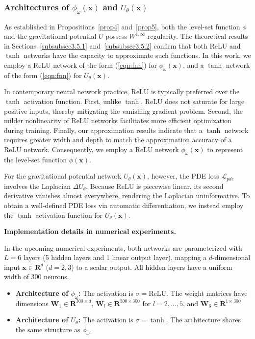 \documentclass[final,hidelinks,onefignum,onetabnum]{siamart251216}
\begin{document}
\subsubsection{Architectures of $\phi_\omega(\mathbf{x})$ and $U_\theta(\mathbf{x})$}

As established in Propositions~\ref{prop4} and~\ref{prop5}, both the level-set function $\phi$ and the gravitational potential $U$ possess $W^{1,\infty}$ regularity. The theoretical results in Sections~\ref{subsubsec3.5.1} and~\ref{subsubsec3.5.2} confirm that both ReLU and $\tanh$ networks have the capacity to approximate such functions.
In this work, we employ a ReLU network of the form (\ref{eqn:fnn}) for $\phi_\omega(\mathbf{\mathbf{x}})$, and a $\tanh$ network of the form (\ref{eqn:fnn}) for $U_\theta(\mathbf{\mathbf{x}})$.

In contemporary neural network practice, ReLU is typically preferred over the $\tanh$ activation function. First, unlike $\tanh$, ReLU does not saturate for large positive inputs, thereby mitigating the vanishing gradient problem. Second, the milder nonlinearity of ReLU networks facilitates more efficient optimization during training. Finally, our approximation results indicate that a $\tanh$ network requires greater width and depth to match the approximation accuracy of a ReLU network.  Consequently, we employ a ReLU network $\phi_\omega(\mathbf{x})$ to represent the level-set function $\phi(\mathbf{x})$.

For the gravitational potential network $U_\theta(\mathbf{x})$, however, the PDE loss $\mathcal{L}_{pde}$ involves the Laplacian $\Delta U_\theta$. Because ReLU is piecewise linear, its second derivative vanishes almost everywhere, rendering the Laplacian uninformative. To obtain a well-defined PDE loss via automatic differentiation, we instead employ the $\tanh$ activation function for $U_\theta(\mathbf{x})$.

\medskip

\noindent \textbf{Implementation details in numerical experiments.}

In the upcoming numerical experiments, both networks are parameterized with $L=6$ layers (5 hidden layers and 1 linear output layer), mapping a $d$-dimensional input $\mathbf{x} \in \mathbf{R}^d$ ($d=2,3$) to a scalar output. All hidden layers have a uniform width of 300 neurons.

\begin{itemize}
	\item \textbf{Architecture of $\phi_\omega$:}
	The activation is $\sigma = \mathrm{ReLU}$. The weight matrices have dimensions $\mathbf{W}_1 \in \mathbf{R}^{300 \times d}$, $\mathbf{W}_l \in \mathbf{R}^{300 \times 300}$ for $l=2,\dots,5$, and $\mathbf{W}_6 \in \mathbf{R}^{1 \times 300}$.
	
	\item \textbf{Architecture of $U_\theta$:}
	The activation is $\sigma = \tanh$. The architecture shares the same structure as $\phi_\omega$.
\end{itemize}
\end{document}

